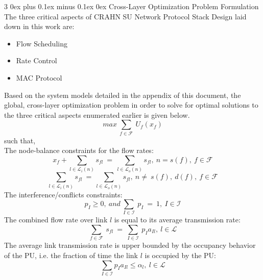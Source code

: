 \documentclass[12pt, draftcls, onecolumn]{IEEEtran}
\makeatletter
\def\subsubsection{\@startsection{subsubsection}%
                                 {3}%
                                 {\z@}%
                                 {0ex plus 0.1ex minus 0.1ex}%
                                 {0ex}%
                                 {\normalfont\normalsize\bfseries}}%
\makeatother
\begin{document}
\subsubsection{Cross-Layer Optimization Problem Formulation}
The three critical aspects of CRAHN SU Network Protocol Stack Design laid down in this work are:
\begin{itemize}
    \item Flow Scheduling
    \item Rate Control
    \item MAC Protocol
\end{itemize}
Based on the system models detailed in the appendix of this document, the global, cross-layer optimization problem in order to solve for optimal solutions to the three critical aspects enumerated earlier is given below.
\begin{equation}
    max\ \sum_{f \in \mathcal{F}}\ U_f(x_f)
\end{equation}
such that,
\\The node-balance constraints for the flow rates:
\[x_f + \sum_{l \in \mathcal{L}_i(n)}s_{fl}\ =\ \sum_{l \in \mathcal{L}_o(n)}s_{fl},\ n=s(f),\ f \in \mathcal{F}\]
\[\sum_{l \in \mathcal{L}_i(n)}s_{fl}\ =\ \sum_{l \in \mathcal{L}_o(n)}s_{fl},\ n \not=\ s(f),\ d(f),\ f \in \mathcal{F}\]
The interference/conflicts constraints:
\[p_I \geq 0,\ and\ \sum_{I \in \mathcal{I}}\ p_I\ =\ 1,\ I \in \mathcal{I}\]
The combined flow rate over link $l$ is equal to its average transmission rate:
\[\sum_{f \in \mathcal{F}}\ s_{fl}\ =\ \sum_{I \in \mathcal{I}}\ p_I a_{Il},\ l \in \mathcal{L}\]
The average link transmission rate is upper bounded by the occupancy behavior of the PU, i.e. the fraction of time the link $l$ is occupied by the PU:
\[\sum_{I \in \mathcal{I}} p_I a_{Il} \leq \alpha_l,\ l \in \mathcal{L}\]
\end{document}
